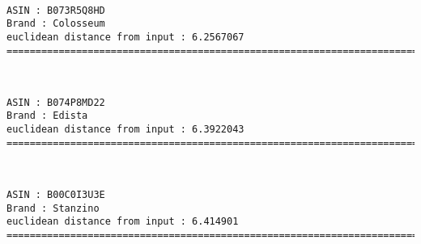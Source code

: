 \documentclass[11pt]{article}
\begin{document}
    \begin{center}
    \end{center}
    { \hspace*{\fill} \\}
    
    \begin{Verbatim}[commandchars=\\\{\}]
ASIN : B073R5Q8HD
Brand : Colosseum
euclidean distance from input : 6.2567067
=============================================================================================================================

    \end{Verbatim}

    \begin{center}
    \end{center}
    { \hspace*{\fill} \\}
    
    \begin{Verbatim}[commandchars=\\\{\}]
ASIN : B074P8MD22
Brand : Edista
euclidean distance from input : 6.3922043
=============================================================================================================================

    \end{Verbatim}

    \begin{center}
    \end{center}
    { \hspace*{\fill} \\}
    
    \begin{Verbatim}[commandchars=\\\{\}]
ASIN : B00C0I3U3E
Brand : Stanzino
euclidean distance from input : 6.414901
=============================================================================================================================

    \end{Verbatim}

    \begin{center}
    \end{center}
    { \hspace*{\fill} \\}
    
\end{document}
